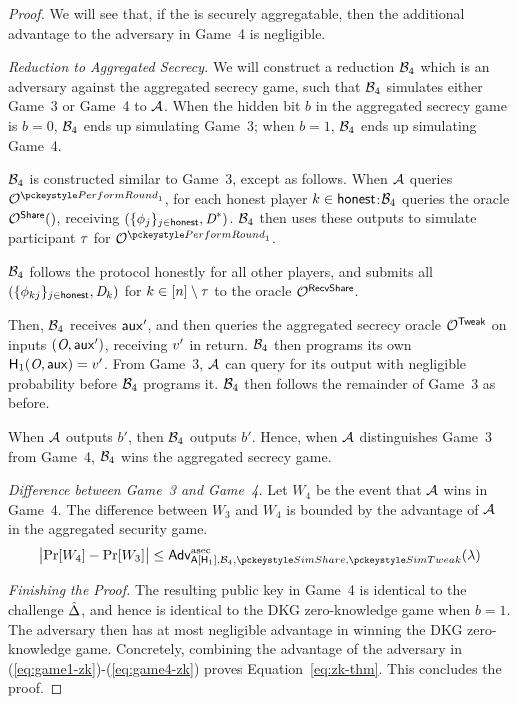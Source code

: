 \begin{proof}
We will see that, if the \AVSS is securely aggregatable,
then the additional advantage to the adversary in Game~4 is negligible.

\medskip

\noindent \textit{Reduction to \AVSS Aggregated Secrecy.}
We will construct a reduction $\mathcal{B}_4$ which is an adversary against the \AVSS aggregated secrecy game,
such that $\mathcal{B}_4$ simulates either Game~3 or Game~4 to $\mathcal{A}$.
When the hidden bit $b$ in the \AVSS aggregated secrecy game is $b=0$, $\mathcal{B}_4$ ends up simulating Game~3;
when $b=1$,  $\mathcal{B}_4$ ends up simulating Game~4.

$\mathcal{B}_4$ is constructed similar to Game~3, except as follows.
When $\mathcal{A}$ queries $\oracle^{\dkgkeygen_1}$,
for each honest player $k \in \mathsf{honest}$:\linebreak[4]
$\mathcal{B}_4$ queries the \AVSS oracle $\mathcal{O}^{\mathsf{Share}}()$,
receiving $(\{ \phi_j \}_{j \in \mathsf{honest}}, \textit{D}^*)$.
$\mathcal{B}_4$ then uses these outputs to simulate participant $\tau$
for $\oracle^{\dkgkeygen_1}$.

$\mathcal{B}_4$ follows the protocol honestly for all other players,
and submits all $(\{ \phi_{kj} \}_{j \in \mathsf{honest}}, \textit{D}_k)$
for $k \in [n] \setminus \tau$
to the \AVSS oracle $\mathcal{O}^{\mathsf{RecvShare}}$.

Then, $\mathcal{B}_4$ receives $\mathsf{aux}'$,
and then queries the \AVSS aggregated secrecy oracle $\mathcal{O}^{\mathsf{Tweak}}$ on inputs $(\textit{O}, \mathsf{aux}')$,
 receiving $v'$ in return.
$\mathcal{B}_4$ then programs its own $\mathsf{H}_1(\textit{O}, \mathsf{aux}) = v'$.
From Game~3,
$\mathcal{A}$ can query for its output with negligible probability before $\mathcal{B}_4$ programs it.
$\mathcal{B}_4$ then follows the remainder of Game~3 as before.

When $\mathcal{A}$ outputs $b'$,
then $\mathcal{B}_4$ outputs $b'$.
Hence, when $\mathcal{A}$ distinguishes Game~3 from Game~4,
$\mathcal{B}_4$ wins the \AVSS aggregated secrecy game.


\medskip

\noindent \textit{Difference between Game~3 and Game~4.}
Let $W_4$ be the event that $\mathcal{A}$ wins in Game~4.
The difference between $W_3$ and $W_4$ is bounded by the advantage of $\mathcal{A}$ in the \AVSS aggregated security game.
\begin{equation} \label{eq:game4-zk}
  \bigabs{\Pr[W_4] - \Pr[W_3] } \leq
  \advant{asec}{\avss[\Hash_1], \bdv_4, \simshare,\simgettweak}(\lambda)
\end{equation}


\medskip

\noindent \textit{Finishing the Proof.}
The resulting public key in Game~4 is identical to the challenge $\hat{\Delta}$,
and hence is identical to the DKG zero-knowledge game when $b=1$.
The adversary then has at most negligible advantage in winning the DKG zero-knowledge game.
Concretely, combining the advantage of the adversary in (\ref{eq:game1-zk})-(\ref{eq:game4-zk}) proves Equation~\ref{eq:zk-thm}.
This concludes the proof.
\end{proof}

